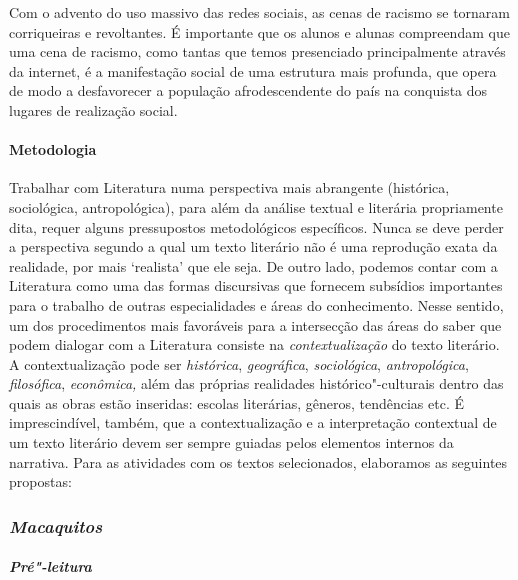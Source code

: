 \documentclass{extarticle}
\begin{document}
Com o advento do uso massivo das redes sociais, as cenas de racismo se
tornaram corriqueiras e revoltantes. É importante que os alunos e alunas
compreendam que uma cena de racismo, como tantas que temos presenciado
principalmente através da internet, é a manifestação social de uma
estrutura mais profunda, que opera de modo a desfavorecer a população
afrodescendente do país na conquista dos lugares de realização social.

\paragraph{Metodologia} Trabalhar com Literatura numa perspectiva mais
abrangente (histórica, sociológica, antropológica), para além da análise
textual e literária propriamente dita, requer alguns pressupostos
metodológicos específicos. Nunca se deve perder a perspectiva segundo a
qual um texto literário não é uma reprodução exata da realidade, por
mais `realista' que ele seja. De outro lado, podemos contar com a
Literatura como uma das formas discursivas que fornecem subsídios
importantes para o trabalho de outras especialidades e áreas do
conhecimento. Nesse sentido, um dos procedimentos mais favoráveis para a
intersecção das áreas do saber que podem dialogar com a Literatura
consiste na \emph{contextualização} do texto literário. A
contextualização pode ser \emph{histórica}, \emph{geográfica},
\emph{sociológica}, \emph{antropológica}, \emph{filosófica},
\emph{econômica,} além das próprias realidades histórico"-culturais
dentro das quais as obras estão inseridas: escolas literárias, gêneros,
tendências etc. É imprescindível, também, que a contextualização e a
interpretação contextual de um texto literário devem ser sempre guiadas
pelos elementos internos da narrativa. Para as atividades com os textos
selecionados, elaboramos as seguintes propostas:


\subsubsection{\textit{Macaquitos}}

\paragraph{\textit{Pré"-leitura }}
\end{document}
